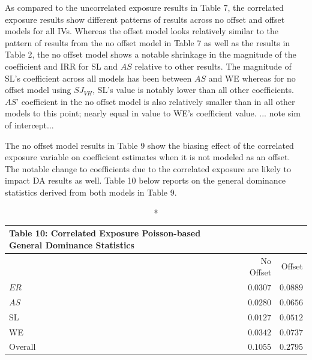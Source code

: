 \documentclass[ShortAfour,times,sageapa]{sagej}
\begin{document}
	As compared to the uncorrelated exposure results in Table 7, the correlated exposure results show different patterns of results across no offset and offset models for all IVs.
	Whereas the offset model looks relatively similar to the pattern of results from the no offset model in Table 7 as well as the results in Table 2, the no offset model shows a notable shrinkage in the magnitude of the coefficient and IRR for SL and $AS$ relative to other results.
	The magnitude of SL's coefficient across all models has been between $AS$ and WE whereas for no offset model using $SJ_{VH}$, SL's value is notably lower than all other coefficients.
	$AS$' coefficient in the no offset model is also relatively smaller than in all other models to this point; nearly equal in value to WE's coefficient value.
	... note sim of intercept...
	
	The no offset model results in Table 9 show the biasing effect of the correlated exposure variable on coefficient estimates when it is not modeled as an offset.
	The notable change to coefficients due to the correlated exposure are likely to impact DA results as well.	
	Table 10 below reports on the general dominance statistics derived from both models in Table 9.
	
	\begin{longtable}{l|rr}
		\caption*{
			{\large Table 10: Correlated Exposure Poisson-based General Dominance Statistics}
		} \\ 
		\toprule
		\multicolumn{1}{l}{} & No Offset & Offset \\ 
		\midrule
		$ER$ & $0.0307$ & $0.0889$ \\ 
		$AS$ & $0.0280$ & $0.0656$ \\ 
		SL & $0.0127$ & $0.0512$ \\ 
		WE & $0.0342$ & $0.0737$ \\ 
		\midrule
		Overall & $0.1055$ & $0.2795$ \\ 
		\bottomrule
	\end{longtable}
\end{document}
